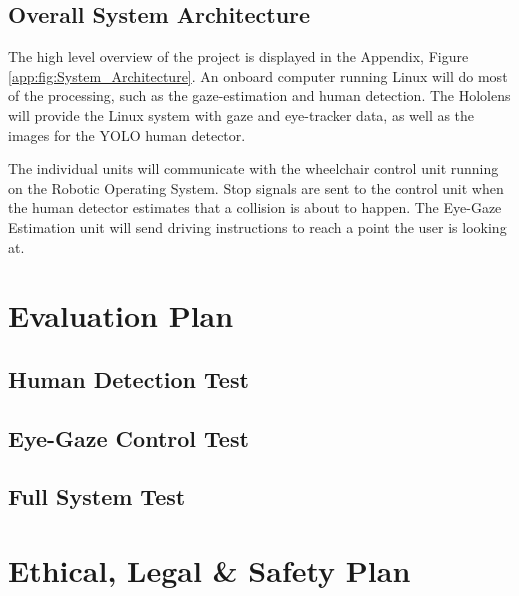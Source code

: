 \documentclass[12pt,a4paper]{report}
\begin{document}
\section{Overall System Architecture}
The high level overview of the project is displayed in the Appendix, Figure \ref{app:fig:System_Architecture}. An onboard computer running Linux will do most of the processing, such as the gaze-estimation and human detection. The Hololens will provide the Linux system with gaze and eye-tracker data, as well as the images for the YOLO human detector.

The individual units will communicate with the wheelchair control unit running on the Robotic Operating System. Stop signals are sent to the control unit when the human detector estimates that a collision is about to happen. The Eye-Gaze Estimation unit will send driving instructions to reach a point the user is looking at. 

\newpage
\chapter{Evaluation Plan}

\section{Human Detection Test}

\section{Eye-Gaze Control Test}

\section{Full System Test}


\newpage
\chapter{Ethical, Legal \& Safety Plan}

\newpage



\newpage

\appendix
\pagestyle{fancy}
\fancyhf{}



\appendixpage
\end{document}
